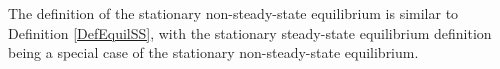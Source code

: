 %
%
%
%

    The definition of the stationary non-steady-state equilibrium is similar to Definition \ref{DefEquilSS}, with the stationary steady-state equilibrium definition being a special case of the stationary non-steady-state equilibrium.

